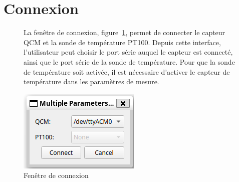 \section{Connexion}

\begin{figure}[H]
    \begin{minipage}{0.64\textwidth}
        La fenêtre de connexion, figure~\ref{fig:connection window}, permet de connecter le capteur QCM et la sonde de température PT100.
        Depuis cette interface, l'utilisateur peut choisir le port série auquel le capteur est connecté, ainsi que le port série de la sonde de température.
        Pour que la sonde de température soit activée, il est nécessaire d'activer le capteur de température dans les paramètres de mesure.
    \end{minipage}\hfill
    \begin{minipage}{0.30\textwidth}
        \centering
        \includegraphics[width=\textwidth]{assets/figures/ConnectionDialogue.png}
        \caption{Fenêtre de connexion}
        \label{fig:connection window}
    \end{minipage}
\end{figure}

